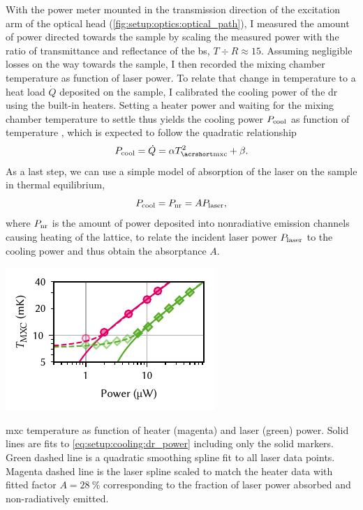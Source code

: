 With the power meter mounted in the transmission direction of the excitation arm of the optical head (\cf \cref{fig:setup:optics:optical_path}), I measured the amount of power directed towards the sample by scaling the measured power with the ratio of transmittance and reflectance of the \gls{bs}, $T\div R\approx\num{15}$.
Assuming negligible losses on the way towards the sample, I then recorded the mixing chamber temperature as function of laser power.
To relate that change in temperature to a heat load $\dot{Q}$ deposited on the sample, I calibrated the cooling power of the \gls{dr} using the built-in heaters.
Setting a heater power and waiting for the mixing chamber temperature to settle thus yields the cooling power $P_{\mathrm{cool}}$ as function of temperature \Tmxc, which is expected to follow the quadratic relationship~\cite{DeWaele2011}
\begin{equation}\label{eq:setup:cooling:dr_power}
    P_{\mr{cool}} = \dot{Q} = \alpha \Tmxc^2 + \beta.
\end{equation}
As a last step, we can use a simple model of absorption of the laser on the sample in thermal equilibrium,
\begin{equation}\label{eq:setup:cooling:absorptance}
    P_{\mathrm{cool}} = P_{\mathrm{nr}} = A P_{\mathrm{laser}},
\end{equation}
where $P_{\mathrm{nr}}$ is the amount of power deposited into nonradiative emission channels causing heating of the lattice, to relate the incident laser power $P_{\mathrm{laser}}$ to the cooling power and thus obtain the absorptance $A$.

\begin{marginfigure}
    \centering
    \includegraphics{img/pdf/setup/laser_heating}
    \caption[]{
        \Acrlong{mxc} temperature as function of heater (magenta) and laser (green) power.
        Solid lines are fits to \cref{eq:setup:cooling:dr_power} including only the solid markers.
        Green dashed line is a quadratic smoothing spline fit to all laser data points.
        Magenta dashed line is the laser spline scaled to match the heater data with fitted factor $A=\qty{28}{\percent}$ corresponding to the fraction of laser power absorbed and non-radiatively emitted.
    }
    \label{fig:setup:cooling:laser}
\end{marginfigure}

